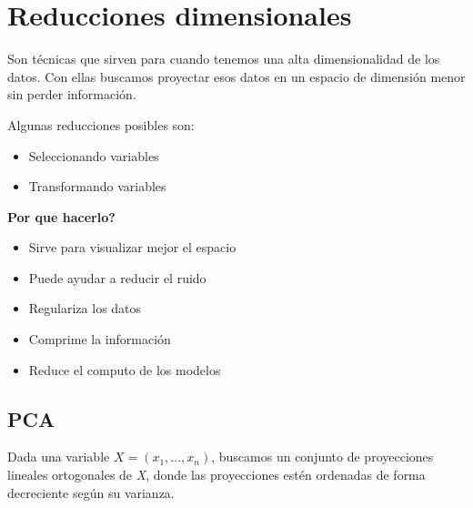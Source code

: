 \documentclass[titlepage,a4paper]{article}
\begin{document}

\section{Reducciones dimensionales}

Son técnicas que sirven para cuando tenemos una alta dimensionalidad de los datos. Con ellas buscamos proyectar esos datos en un espacio de dimensión menor sin perder información. 

Algunas reducciones posibles son:
\begin{itemize}
    \item Seleccionando variables
    \item Transformando variables
\end{itemize}

\textbf{Por que hacerlo?}

\begin{itemize}
    \item Sirve para visualizar mejor el espacio
    \item Puede ayudar a reducir el ruido
    \item Regulariza los datos
    \item Comprime la información
    \item Reduce el computo de los modelos
\end{itemize}

\subsection{PCA}

Dada una variable \begin{math} X = (x_1,...,x_n) \end{math}, buscamos un conjunto de proyecciones lineales ortogonales de \textit{X}, donde las proyecciones estén ordenadas de forma decreciente según su varianza.
\end{document}
